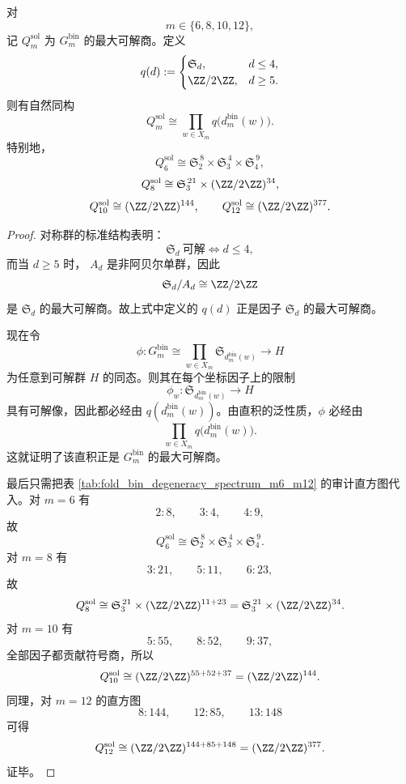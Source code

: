 
\begin{theorem}[审计偶数窗最大可解商的显式相图]\label{thm:xi-foldbin-audited-even-maximal-solvable-quotient}
对
\[
m\in\{6,8,10,12\},
\]
记
\(
Q_m^{\mathrm{sol}}
\)
为
\(
G_m^{\mathrm{bin}}
\)
的最大可解商。定义
\[
q(d):=
\begin{cases}
\mathfrak S_d,& d\le 4,\\
\ZZ/2\ZZ,& d\ge 5.
\end{cases}
\]
则有自然同构
\[
Q_m^{\mathrm{sol}}
\cong
\prod_{w\in X_m}q\!\bigl(d_m^{\mathrm{bin}}(w)\bigr).
\]
特别地，
\[
Q_6^{\mathrm{sol}}
\cong
\mathfrak S_2^{\,8}\times \mathfrak S_3^{\,4}\times \mathfrak S_4^{\,9},
\]
\[
Q_8^{\mathrm{sol}}
\cong
\mathfrak S_3^{\,21}\times (\ZZ/2\ZZ)^{34},
\]
\[
Q_{10}^{\mathrm{sol}}
\cong
(\ZZ/2\ZZ)^{144},
\qquad
Q_{12}^{\mathrm{sol}}
\cong
(\ZZ/2\ZZ)^{377}.
\]
\end{theorem}
\begin{proof}
对称群的标准结构表明：
\[
\mathfrak S_d\ \text{可解}
\iff
d\le 4,
\]
而当 \(d\ge 5\) 时，
\(
A_d
\)
是非阿贝尔单群，因此
\[
\mathfrak S_d/A_d\cong \ZZ/2\ZZ
\]
是 \(\mathfrak S_d\) 的最大可解商。故上式中定义的 \(q(d)\) 正是因子 \(\mathfrak S_d\) 的最大可解商。

现在令
\[
\phi:
G_m^{\mathrm{bin}}
\cong
\prod_{w\in X_m}\mathfrak S_{d_m^{\mathrm{bin}}(w)}
\longrightarrow H
\]
为任意到可解群 \(H\) 的同态。则其在每个坐标因子上的限制
\[
\phi_w:\mathfrak S_{d_m^{\mathrm{bin}}(w)}\to H
\]
具有可解像，因此都必经由 \(q(d_m^{\mathrm{bin}}(w))\)。由直积的泛性质，\(\phi\) 必经由
\[
\prod_{w\in X_m}q\!\bigl(d_m^{\mathrm{bin}}(w)\bigr).
\]
这就证明了该直积正是
\(
G_m^{\mathrm{bin}}
\)
的最大可解商。

最后只需把表 \ref{tab:fold_bin_degeneracy_spectrum_m6_m12} 的审计直方图代入。对
\(
m=6
\)
有
\[
2:8,\qquad 3:4,\qquad 4:9,
\]
故
\[
Q_6^{\mathrm{sol}}
\cong
\mathfrak S_2^{\,8}\times \mathfrak S_3^{\,4}\times \mathfrak S_4^{\,9}.
\]
对
\(
m=8
\)
有
\[
3:21,\qquad 5:11,\qquad 6:23,
\]
故
\[
Q_8^{\mathrm{sol}}
\cong
\mathfrak S_3^{\,21}\times (\ZZ/2\ZZ)^{11+23}
=
\mathfrak S_3^{\,21}\times (\ZZ/2\ZZ)^{34}.
\]
对
\(
m=10
\)
有
\[
5:55,\qquad 8:52,\qquad 9:37,
\]
全部因子都贡献符号商，所以
\[
Q_{10}^{\mathrm{sol}}\cong (\ZZ/2\ZZ)^{55+52+37}=(\ZZ/2\ZZ)^{144}.
\]
同理，对
\(
m=12
\)
的直方图
\[
8:144,\qquad 12:85,\qquad 13:148
\]
可得
\[
Q_{12}^{\mathrm{sol}}\cong (\ZZ/2\ZZ)^{144+85+148}=(\ZZ/2\ZZ)^{377}.
\]
证毕。
\end{proof}

